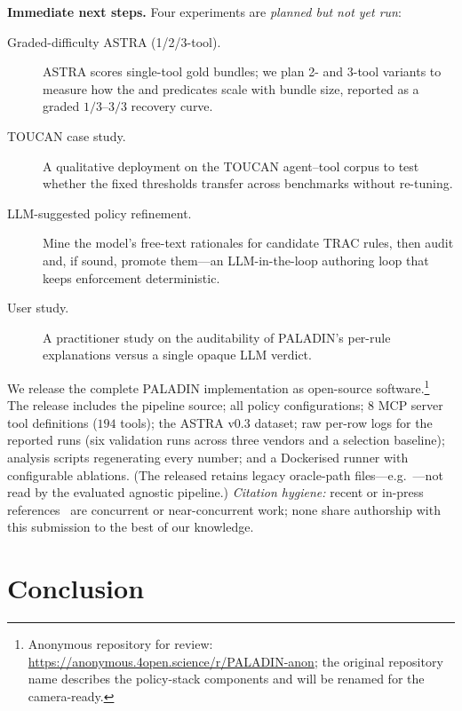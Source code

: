 \documentclass[sigconf,review,anonymous]{acmart}
\begin{document}
\textbf{Immediate next steps.} Four experiments are \emph{planned but not yet run}:
\begin{description}
  \item[Graded-difficulty ASTRA (1/2/3-tool).] ASTRA scores single-tool gold bundles; we plan 2- and 3-tool variants to measure how the  and  predicates scale with bundle size, reported as a graded $1/3$--$3/3$ recovery curve.
  \item[TOUCAN case study.] A qualitative deployment on the TOUCAN agent--tool corpus to test whether the fixed thresholds transfer across benchmarks without re-tuning.
  \item[LLM-suggested policy refinement.] Mine the model's free-text rationales for candidate TRAC rules, then audit and, if sound, promote them---an LLM-in-the-loop authoring loop that keeps enforcement deterministic.
  \item[User study.] A practitioner study on the auditability of PALADIN's per-rule explanations versus a single opaque LLM verdict.
\end{description}

We release the complete PALADIN implementation as open-source software.\footnote{Anonymous repository for review: \url{https://anonymous.4open.science/r/PALADIN-anon}; the original repository name describes the policy-stack components and will be renamed for the camera-ready.} The release includes the pipeline source; all policy configurations; 8 MCP server tool definitions ($194$ tools); the ASTRA v0.3 dataset; raw per-row logs for the reported runs (six validation runs across three vendors and a selection baseline); analysis scripts regenerating every number; and a Dockerised runner with configurable ablations. (The released  retains legacy oracle-path files---e.g.\ ---not read by the evaluated agnostic pipeline.) \emph{Citation hygiene:} recent or in-press references~\cite{gupta2025security,jamshidi2025securing,chu2026stateless,patil2026sentinelagent,rampalli2026pedigree} are concurrent or near-concurrent work; none share authorship with this submission to the best of our knowledge.

\section{Conclusion}
\label{sec:conclusion}
\end{document}
